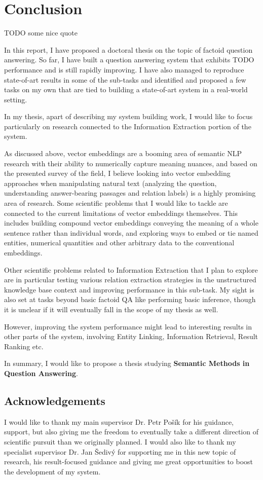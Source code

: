 \chapter{Conclusion}
\label{ch:concl}

TODO some nice quote

In this report, I have proposed a doctoral thesis on the topic
of factoid question answering.
So far, I have built a question answering system that exhibits
TODO performance and is still rapidly improving.  I have also
managed to reproduce state-of-art results in some of the sub-tasks
and identified and proposed a few tasks on my own that are tied
to building a state-of-art system in a real-world setting.

In my thesis, apart of describing my system building work, I would
like to focus particularly on research connected to the Information Extraction
portion of the system.

As discussed above, vector embeddings are a booming area of semantic
NLP research with their ability to numerically capture meaning nuances,
and based on the presented survey of the field, I believe looking into
vector embedding approaches when manipulating natural text
(analyzing the question, understanding answer-bearing
passages and relation labels) is a highly promising area of research.
Some scientific problems that I would like to tackle are connected
to the current limitations of vector embeddings themselves.
This includes building compound vector embeddings conveying
the meaning of a whole sentence rather than individual words,
and
exploring ways to embed or tie named entities, numerical quantities
and other arbitrary data to the conventional embeddings.

Other scientific problems related to Information Extraction that
I plan to explore are in particular testing various relation
extraction strategies in the unstructured knowledge base context
and improving performance in this sub-task.
My sight is also set at tasks beyond basic factoid QA like performing basic inference,
though it is unclear if it will eventually fall in the scope of my
thesis as well.

However, improving the system performance might lead to interesting
results in other parts of the system, involving Entity Linking,
Information Retrieval, Result Ranking etc.

In summary, I would like to propose a thesis studying
\textbf{Semantic Methods in Question Answering}.

\section{Acknowledgements}

I would like to thank my main supervisor Dr. Petr Pošík
for his guidance, support, but also giving me the freedom to
eventually take a different direction of scientific pursuit
than we originally planned.
I would also like to thank my specialist supervisor Dr. Jan Šedivý
for supporting me in this new topic of research, his result-focused
guidance and giving me great opportunities to boost the development
of my system.
